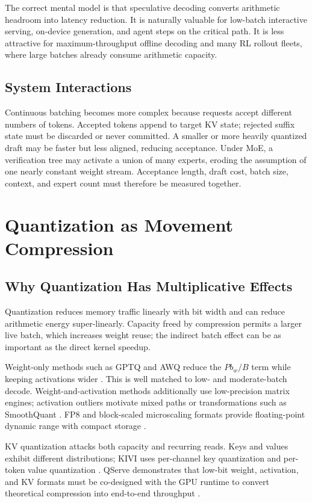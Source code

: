 \documentclass[journal]{IEEEtran}
\begin{document}
The correct mental model is that speculative decoding converts arithmetic headroom into latency reduction. It is naturally valuable for low-batch interactive serving, on-device generation, and agent steps on the critical path. It is less attractive for maximum-throughput offline decoding and many RL rollout fleets, where large batches already consume arithmetic capacity.

\subsection{System Interactions}
Continuous batching becomes more complex because requests accept different numbers of tokens. Accepted tokens append to target KV state; rejected suffix state must be discarded or never committed. A smaller or more heavily quantized draft may be faster but less aligned, reducing acceptance. Under MoE, a verification tree may activate a union of many experts, eroding the assumption of one nearly constant weight stream. Acceptance length, draft cost, batch size, context, and expert count must therefore be measured together.

\section{Quantization as Movement Compression}
\subsection{Why Quantization Has Multiplicative Effects}
Quantization reduces memory traffic linearly with bit width and can reduce arithmetic energy super-linearly. Capacity freed by compression permits a larger live batch, which increases weight reuse; the indirect batch effect can be as important as the direct kernel speedup.

Weight-only methods such as GPTQ and AWQ reduce the $Pb_w/B$ term while keeping activations wider \cite{frantar2023gptq,lin2024awq}. This is well matched to low- and moderate-batch decode. Weight-and-activation methods additionally use low-precision matrix engines; activation outliers motivate mixed paths or transformations such as SmoothQuant \cite{dettmers2022llmint8,xiao2023smoothquant}. FP8 and block-scaled microscaling formats provide floating-point dynamic range with compact storage \cite{micikevicius2022fp8,ocp2023mx}.

KV quantization attacks both capacity and recurring reads. Keys and values exhibit different distributions; KIVI uses per-channel key quantization and per-token value quantization \cite{liu2024kivi}. QServe demonstrates that low-bit weight, activation, and KV formats must be co-designed with the GPU runtime to convert theoretical compression into end-to-end throughput \cite{lin2025qserve}.
\end{document}
